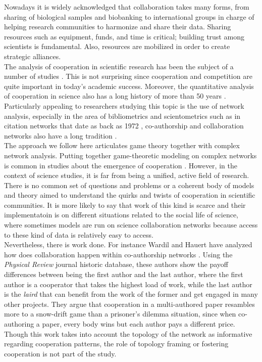 \documentclass{bmcart}
\begin{document}
Nowadays it is widely acknowledged that collaboration takes many
forms, from sharing of biological samples and biobanking to
international groups in charge of helping research communities to
harmonize and share their data. Sharing resources such as equipment,
funds, and time is critical; building trust among scientists is
fundamental. Also, resources are mobilized in order to create
strategic alliances.\\


The analysis of cooperation in scientific research has been the
subject of a number of studies
\cite{VermeulenPenders:2013,Newman:2001,Newman:2004,Elango-etal:2012,HernandezLemus:2013,Strasser:2006,Strasser:2012}. This
is not surprising since cooperation and competition are quite
important in today's academic success. Moreover, the quantitative
analysis of cooperation in science also has a long history of more
than 50 years
\cite{Mali-etal:2012,Scharnhorst-etal:2012}. Particularly appealing to
researchers studying this topic is the use of network analysis,
especially in the area of bibliometrics and scientometrics such as in
citation networks that date as back as 1972 \cite{Garfield:1972},
co-authorship and collaboration networks also have a long tradition
\cite{Todorov-etal:1991,Wagner-etal:2017}.\\

The approach we follow here articulates game theory together with
complex network analysis. Putting together game-theoretic modeling on
complex networks is common in studies about the emergence of
cooperation
\cite{SzaboFath:2007,Nowak-etal:92,OshtukiNowak:2006,Santos-etal:2005,Santos-etal:2006}.
However, in the context of science studies, it is far from being a
unified, active field of research. There is no common set of questions
and problems or a coherent body of models and theory aimed to
understand the quirks and twists of cooperation in scientific
communities. It is more likely to say that work of this kind is
scarce and their implementatoin is on different situations related to
the social life of science, where sometimes models are run on science
collaboration networks because access to these kind of data is
relatively easy to access.\\

Nevertheless, there is work done. For instance Wardil and Hauert have
analyzed how does collaboration happen within co-authorship networks
\cite{Wardil-etal:2015}. Using the \emph{Physical Review} journal
historic database, these authors show the payoff differences between
being the first author and the last author, where the first author is
a cooperator that takes the highest load of work, while the last
author is the \emph{laird} that can benefit from the work of the
former and get engaged in many other projects. They argue that
cooperation in a multi-authored paper resambles more to a snow-drift
game than a prisoner's dilemma situation, since when co-authoring a
paper, every body wins but each author pays a different price. Though
this work takes into account the topology of the network as
informative regarding cooperation patterns, the role of topology
framing or fostering cooperation is not part of the study. \\
\end{document}
